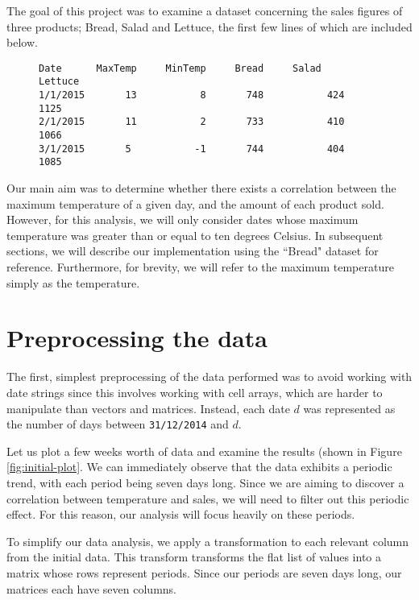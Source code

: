 The goal of this project was to examine a dataset concerning the sales figures of three products; Bread, Salad and Lettuce, the first few lines of which are included below.

\begin{figure}[h!]
\centering
\begin{verbatim}
Date      MaxTemp     MinTemp     Bread     Salad     Lettuce
1/1/2015       13           8       748		      424		       1125
2/1/2015       11           2       733		      410		       1066
3/1/2015       5           -1       744		      404		       1085
\end{verbatim}
\end{figure}

Our main aim was to determine whether there exists a correlation between the maximum temperature of a given day, and the amount of each product sold. However, for this analysis, we will only consider dates whose maximum temperature was greater than or equal to ten degrees Celsius. In subsequent sections, we will describe our implementation using the ``Bread" dataset for reference. Furthermore, for brevity, we will refer to the maximum temperature simply as the temperature.

\section{Preprocessing the data}\label{sec:preprocess}

The first, simplest preprocessing of the data performed was to avoid working with date strings since this involves working with cell arrays, which are harder to manipulate than vectors and matrices. Instead, each date $d$ was represented as the number of days between \texttt{31/12/2014} and $d$.

Let us plot a few weeks worth of data and examine the results (shown in Figure \ref{fig:initial-plot}. We can immediately observe that the data exhibits a periodic trend, with each period being seven days long. Since we are aiming to discover a correlation between temperature and sales, we will need to filter out this periodic effect. For this reason, our analysis will focus heavily on these periods.


To simplify our data analysis, we apply a transformation to each relevant column from the initial data. This transform transforms the flat list of values into a matrix whose rows represent periods. Since our periods are seven days long, our matrices each have seven columns.

